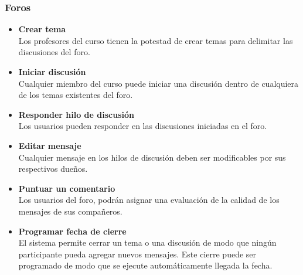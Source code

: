 \subsubsection{Foros}
\begin{itemize}
	\item \textbf{Crear tema}\\
	Los profesores del curso tienen la potestad de crear temas para delimitar las discusiones del foro.
	\item \textbf{Iniciar discusión}\\
	Cualquier miembro del curso puede iniciar una discusión dentro de cualquiera de los temas existentes del foro.
	\item \textbf{Responder hilo de discusión}\\
	Los usuarios pueden responder en las discusiones iniciadas en el foro.
	\item \textbf{Editar mensaje}\\
	Cualquier mensaje en los hilos de discusión deben ser modificables por sus respectivos dueños.
	\item \textbf{Puntuar un comentario}\\
	Los usuarios del foro, podrán asignar una evaluación de la calidad de los mensajes de sus compañeros.
	\item \textbf{Programar fecha de cierre}\\
	El sistema permite cerrar un tema o una discusión de modo que ningún participante pueda agregar nuevos mensajes. Este cierre puede ser programado de modo que se ejecute automáticamente llegada la fecha.
\end{itemize}

